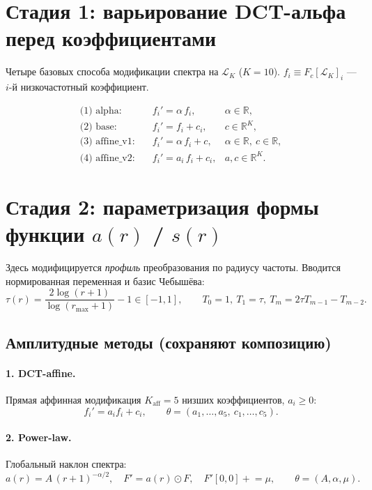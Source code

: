\documentclass[11pt,a4paper]{article}
\begin{document}
\section{Стадия 1: варьирование DCT-альфа перед коэффициентами}

Четыре базовых способа модификации спектра на $\mathcal{L}_K$ ($K=10$).
$f_i \equiv F_c[\mathcal{L}_K]_i$ — $i$-й низкочастотный коэффициент.

\begin{align}
\text{(1) alpha:}    \quad & f_i' = \alpha\, f_i, & \alpha \in \mathbb{R}, \\
\text{(2) base:}     \quad & f_i' = f_i + c_i, & c \in \mathbb{R}^{K}, \\
\text{(3) affine\_v1:} \quad & f_i' = \alpha\, f_i + c, & \alpha \in \mathbb{R},\ c \in \mathbb{R}, \\
\text{(4) affine\_v2:} \quad & f_i' = a_i\, f_i + c_i, & a, c \in \mathbb{R}^{K}.
\end{align}

\section{Стадия 2: параметризация формы функции $a(r)$ / $s(r)$}

Здесь модифицируется \emph{профиль} преобразования по радиусу частоты. Вводится
нормированная переменная и базис Чебышёва:
\begin{equation}
\tau(r) = \frac{2\log(r+1)}{\log(r_{\max}+1)} - 1 \in [-1, 1], \qquad
T_0 = 1,\ T_1 = \tau,\ T_m = 2\tau T_{m-1} - T_{m-2}.
\end{equation}

\subsection*{Амплитудные методы (сохраняют композицию)}

\paragraph{1. DCT-affine.} Прямая аффинная модификация $K_{\text{aff}}=5$ низших
коэффициентов, $a_i \ge 0$:
\begin{equation}
f_i' = a_i f_i + c_i, \qquad \theta = (a_1,\dots,a_5,\ c_1,\dots,c_5).
\end{equation}

\paragraph{2. Power-law.} Глобальный наклон спектра:
\begin{equation}
a(r) = A\,(r+1)^{-\alpha/2}, \quad F' = a(r)\odot F,\quad F'[0,0]\mathrel{+}=\mu,
\qquad \theta = (A, \alpha, \mu).
\end{equation}
\end{document}
